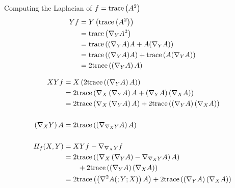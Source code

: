 \begin{frame}[allowframebreaks]{Computing the Laplacian of \(f=\text{trace}\left({A^{2}}\right)\)}
  \begin{align*}
    Yf & = Y\left(\text{trace}\left({A^{2}}\right)\right)                                   \\
       & = \text{trace}\left({\nabla_{Y}A^{2}}\right)                               \\
       & = \text{trace}\left({(\nabla_{Y}A)A+A(\nabla_{Y}A)}\right)         \\
       & = \text{trace}\left({(\nabla_{Y}A)A}\right)+\text{trace}\left({A(\nabla_{Y}A)}\right) \\
       & = 2\text{trace}\left({\left(\nabla_{Y}A\right)A}\right)
  \end{align*}

  \framebreak

  \begin{align*}
    XYf                               & = X\left(2\text{trace}\left({\left(\nabla_{Y}A\right)A}\right)\right)                                                                               \\
                                      & = 2\text{trace}\left({\nabla_{X}\left(\nabla_{Y}A\right)A+\left(\nabla_{Y}A\right)\left(\nabla_{X}A\right)}\right)          \\
                                      & = 2\text{trace}\left({\nabla_{X}\left(\nabla_{Y}A\right)A}\right)+2\text{trace}\left({\left(\nabla_{Y}A\right)\left(\nabla_{X}A\right)}\right) \\
                                      &                                                                                                                                          \\
    \left(\nabla_{X}Y\right)A & = 2\text{trace}\left({\left(\nabla_{\nabla_{X}Y}A\right)A}\right)                                                                           \\
                                      &                                                                                                                                          \\
    H_{f}(X,Y)                        & = XYf-\nabla_{\nabla_{X}Y}f                                                                                              \\
                                      & = 2\text{trace}\left({\left(\nabla_{X}\left(\nabla_{Y}A\right)-\nabla_{\nabla_{X}Y}A\right)A}\right)                        \\
                                      & \qquad+2\text{trace}\left({\left(\nabla_{Y}A\right)\left(\nabla_{X}A\right)}\right)                                                         \\
                                      & = 2\text{trace}\left({\left(\nabla^{2}A(;Y;X)\right)A}\right)+2\text{trace}\left({\left(\nabla_{Y}A\right)\left(\nabla_{X}A\right)}\right)
  \end{align*}


\end{frame}
